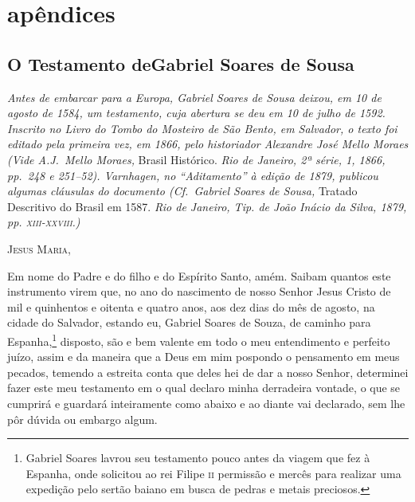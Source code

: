 \part{apêndices}


\chapter[O Testamento de Gabriel Soares de Sousa]{O Testamento de\break Gabriel Soares de Sousa}
\vspace*{-3em}

\textit{Antes de embarcar para a
Europa, Gabriel Soares de Sousa deixou, em 10 de agosto de 1584, um
testamento, cuja abertura se deu em 10 de julho de 1592. Inscrito no
Livro do Tombo do Mosteiro de São Bento, em Salvador, o texto foi
editado pela primeira vez, em 1866, pelo historiador Alexandre José
Mello Moraes (Vide A.J.~Mello Moraes,} Brasil Histórico. \textit{Rio de
Janeiro, 2ª série, 1, 1866, pp.~248 e 251--52). Varnhagen, no
“Aditamento” à edição de 1879, publicou algumas cláusulas do documento
(Cf.~Gabriel Soares de Sousa,} Tratado Descritivo do Brasil em
1587. \textit{Rio de Janeiro, Tip. de João Inácio da Silva, 1879, pp.
\textsc{xiii-xxviii}.)}
\bigskip

\textsc{Jesus Maria,}
\medskip

Em nome do Padre e do filho e do Espírito Santo, amém. Saibam quantos
este instrumento virem que, no ano do nascimento de nosso Senhor Jesus
Cristo de mil e quinhentos e oitenta e quatro anos, aos dez dias do mês
de agosto, na cidade do Salvador, estando eu, Gabriel Soares de Souza,
de caminho para Espanha,\footnote{ Gabriel Soares lavrou seu testamento
pouco antes da viagem que fez à Espanha, onde solicitou ao rei Filipe
\textsc{ii} permissão e mercês para realizar uma expedição pelo sertão baiano em
busca de pedras e metais preciosos.} disposto, são e bem valente em
todo o meu entendimento e perfeito juízo, assim e da maneira que a Deus
em mim pospondo o pensamento em meus pecados, temendo a estreita conta
que deles hei de dar a nosso Senhor, determinei fazer este meu
testamento em o qual declaro minha derradeira vontade, o que se
cumprirá e guardará inteiramente como abaixo e ao diante vai declarado,
sem lhe pôr dúvida ou embargo algum. 

